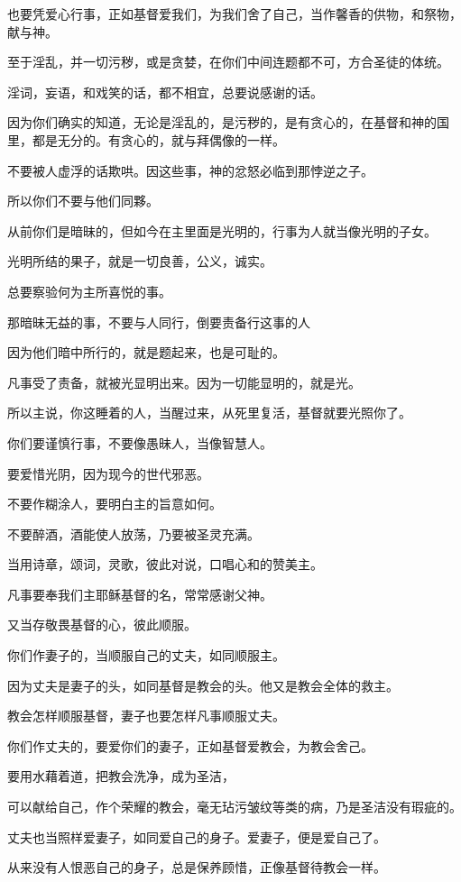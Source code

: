 \documentclass[12pt,oneside]{book}
\begin{document}
也要凭爱心行事，正如基督爱我们，为我们舍了自己，当作馨香的供物，和祭物，献与神。

至于淫乱，并一切污秽，或是贪婪，在你们中间连题都不可，方合圣徒的体统。

淫词，妄语，和戏笑的话，都不相宜，总要说感谢的话。

因为你们确实的知道，无论是淫乱的，是污秽的，是有贪心的，在基督和神的国里，都是无分的。有贪心的，就与拜偶像的一样。

不要被人虚浮的话欺哄。因这些事，神的忿怒必临到那悖逆之子。

所以你们不要与他们同夥。

从前你们是暗昧的，但如今在主里面是光明的，行事为人就当像光明的子女。

光明所结的果子，就是一切良善，公义，诚实。

总要察验何为主所喜悦的事。

那暗昧无益的事，不要与人同行，倒要责备行这事的人

因为他们暗中所行的，就是题起来，也是可耻的。

凡事受了责备，就被光显明出来。因为一切能显明的，就是光。

所以主说，你这睡着的人，当醒过来，从死里复活，基督就要光照你了。

你们要谨慎行事，不要像愚昧人，当像智慧人。

要爱惜光阴，因为现今的世代邪恶。

不要作糊涂人，要明白主的旨意如何。

不要醉酒，酒能使人放荡，乃要被圣灵充满。

当用诗章，颂词，灵歌，彼此对说，口唱心和的赞美主。

凡事要奉我们主耶稣基督的名，常常感谢父神。

又当存敬畏基督的心，彼此顺服。

你们作妻子的，当顺服自己的丈夫，如同顺服主。

因为丈夫是妻子的头，如同基督是教会的头。他又是教会全体的救主。

教会怎样顺服基督，妻子也要怎样凡事顺服丈夫。

你们作丈夫的，要爱你们的妻子，正如基督爱教会，为教会舍己。

要用水藉着道，把教会洗净，成为圣洁，

可以献给自己，作个荣耀的教会，毫无玷污皱纹等类的病，乃是圣洁没有瑕疵的。

丈夫也当照样爱妻子，如同爱自己的身子。爱妻子，便是爱自己了。

从来没有人恨恶自己的身子，总是保养顾惜，正像基督待教会一样。
\end{document}
